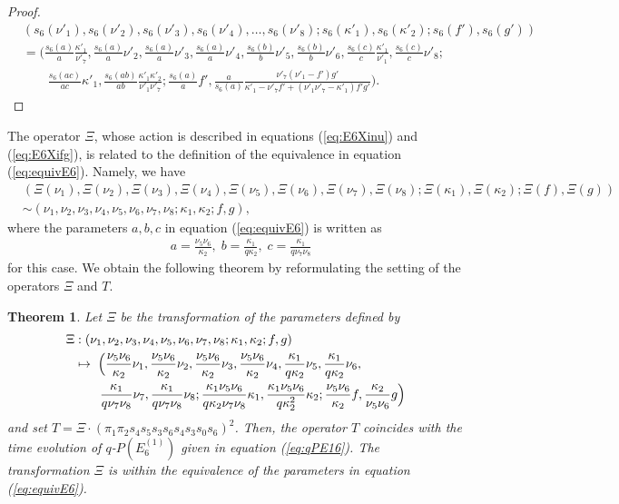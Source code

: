 \documentclass[12pt]{amsart}
\numberwithin{equation}{section}
\newtheorem{thm}[prop]{\bf Theorem}
\theoremstyle{definition}
\begin{document}
\begin{proof}
\begin{align}
& (s _6 ( \nu '_1) , s _6 (\nu '_2) , s _6 ( \nu '_3) , s _6 ( \nu '_4) , \dots , s _6 (\nu '_8) ; s _6 (\kappa '_1) , s _6 (\kappa '_2) ; s _6 (f' ) , s _6 (g') ) \nonumber \\& =  (\frac{s _6 (a)}{a} \frac{\kappa '_1 }{\nu '_7} , \frac{s _6 (a)}{a} \nu '_2 , \frac{s _6 (a)}{a} \nu '_3 , \frac{s _6 (a)}{a} \nu '_4 , \frac{s _6 (b)}{b} \nu '_5  , \frac{s _6 (b)}{b} \nu '_6 , \frac{s _6 (c)}{c} \frac{\kappa '_1 }{\nu '_1} , \frac{s _6 (c)}{c} \nu '_8 ; \nonumber \\
& \qquad \frac{s _6 (ac)}{ac} \kappa '_1, \frac{s _6 (ab)}{ab} \frac{\kappa '_1 \kappa '_2 }{\nu '_1 \nu '_7 } ;  \frac{s _6 (a)}{a} f', \frac{a}{s _6 (a)} \frac{\nu '_7 ( \nu '_1 - f' ) g' }{ \kappa '_1  -  \nu '_7 f' + ( \nu '_1 \nu '_7 - \kappa '_1 )f'g' } ) . \nonumber 
\end{align} 
\end{proof}
The operator $\Xi $, whose action is described in equations (\ref{eq:E6Xinu}) and (\ref{eq:E6Xifg}), is related to the definition of the equivalence in equation (\ref{eq:equivE6}).
Namely, we have
\begin{align}
& ( \Xi (\nu_1) , \Xi (\nu_2 ) , \Xi (\nu_3 ) , \Xi (\nu_4 ) , \Xi (\nu_5 ) , \Xi (\nu_6 ) , \Xi (\nu_7 ) , \Xi (\nu_8 ) ; \Xi (\kappa_1) , \Xi (\kappa_2 ) ; \Xi (f ) , \Xi (g ) )  \\ 
& \sim (\nu_1 , \nu_2 , \nu_3 , \nu_4 ,\nu_5 ,\nu_6 , \nu_7 ,\nu_8 ;\kappa_1 ,\kappa_2 ; f ,g ) , \nonumber
\end{align}
where the parameters $a,b,c$ in equation (\ref{eq:equivE6}) is written as 
\begin{align}
& a = \frac{ \nu_ 5 \nu_ 6 }{\kappa_2 } , \; b = \frac{\kappa_1 }{q \kappa_2 } , \; c = \frac{\kappa_1 }{q \nu_7 \nu_8 } 
\end{align}
for this case.
We obtain the following theorem by reformulating the setting of the operators $\Xi $ and $T$.
\begin{thm}
Let $\Xi $ be the transformation of the parameters defined by
\begin{align}
\Xi  & : (\nu_1 , \nu_2 , \nu_3 , \nu_4 ,\nu_5 ,\nu_6 , \nu_7 ,\nu_8 ;\kappa_1 ,\kappa_2 ; f ,g) \label{eq:E6Xi} \\
& \mapsto \; \Bigl( \frac{ \nu_ 5 \nu_ 6 }{\kappa_2 } \nu _1 , \frac{ \nu_ 5 \nu_ 6 }{\kappa_2 }  \nu _2 , \frac{ \nu_ 5 \nu_ 6 }{\kappa_2 }  \nu _3 , \frac{ \nu_ 5 \nu_ 6 }{\kappa_2 }  \nu _4 , \frac{\kappa_1 }{q \kappa_2 } \nu _5,\frac{\kappa_1 }{q \kappa_2 } \nu _6 , \nonumber \\
& \qquad \frac{\kappa_1 }{q \nu _7 \nu_8 } \nu _7, \frac{\kappa_1 }{q \nu_7 \nu _8} \nu _8 ;  \frac{\kappa _1 \nu_5 \nu_6 }{q \kappa_2 \nu_7 \nu_8 } \kappa _1 ,\frac{\kappa_1 \nu_5 \nu_6 }{q \kappa_2^2} \kappa _2   ; \frac{ \nu_ 5 \nu_ 6 }{\kappa_2 } f, \frac{\kappa_2 }{ \nu_ 5 \nu_ 6 } g \Bigr) \nonumber
\end{align}
and set $T= \Xi \cdot (\pi _1 \pi _2 s_4 s_5 s_3 s_6 s_4 s_3 s_0 s_6 )^2 $.
Then, the operator $T$ coincides with the time evolution of $q$-$P(E^{(1)}_6)$ given in equation (\ref{eq:qPE16}).
The transformation $\Xi $ is within the equivalence of the parameters in equation (\ref{eq:equivE6}).
\end{thm}
\end{document}
